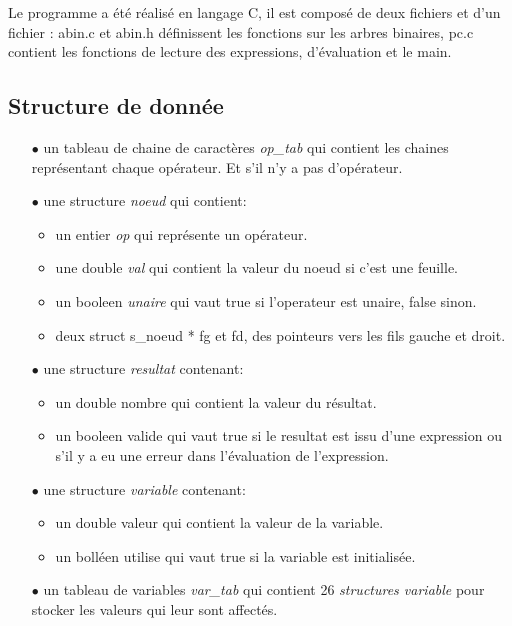 \documentclass[a4paper,11pt,DIV=11]{scrartcl}
\begin{document}
\begin{onehalfspace}
    Le programme a été réalisé en langage C, il est composé de deux fichiers  et d'un fichier
    : abin.c et abin.h définissent les fonctions sur les arbres binaires, pc.c contient les
    fonctions de lecture des expressions, d'évaluation et le main.\\ 

    \subsection*{Structure de donnée}

    \begin{itemize}
        \item[$\bullet$] un tableau de chaine de caractères \emph{op\_tab} qui contient les chaines
            représentant chaque opérateur. Et  s'il n'y a pas d'opérateur.
        \item[$\bullet$] une structure \emph{noeud} qui contient:
            \begin{itemize}
                \item un entier \emph{op} qui représente un opérateur.
                \item une double \emph{val} qui contient la valeur du noeud si c'est une feuille.
                \item un booleen \emph{unaire} qui vaut true si l'operateur est unaire, false sinon.
                \item deux struct s\_noeud * fg et fd, des pointeurs vers les fils gauche et droit.
            \end{itemize}
        \item[$\bullet$] une structure \emph{resultat} contenant:
            \begin{itemize}
                \item un double nombre qui contient la valeur du résultat.
                \item un booleen valide qui vaut true si le resultat est issu d'une expression
                    ou s'il y a eu une erreur dans l'évaluation de l'expression.
            \end{itemize}
        \item[$\bullet$] une structure \emph{variable} contenant:
            \begin{itemize}
                \item un double valeur qui contient la valeur de la variable.
                \item un bolléen utilise qui vaut true si la variable est initialisée.
            \end{itemize}
        \item[$\bullet$] un tableau de variables \emph{var\_tab} qui contient 26 \emph{structures variable}
            pour stocker les valeurs qui leur sont affectés.
    \end{itemize}
     \\


\end{onehalfspace}
\end{document}
